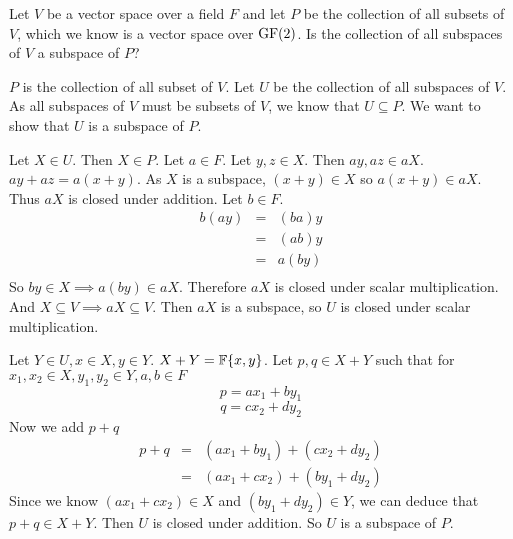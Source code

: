 \begin{problem}[Golan 93]

Let $V$ be a vector space over a field $F$ and let $P$ be the collection of all
subsets of $V$, which we know is a vector space over $\operatorname{GF}(2)$.  Is the
collection of all subspaces of $V$ a subspace of $P$?

\end{problem}
\smallskip
\begin{solution}

$P$ is the collection of all subset of $V$. Let $U$ be the collection of all subspaces of $V$. As all subspaces of $V$ must be subsets of $V$, we know that $U \subseteq P$. We want to show that $U$ is a subspace of $P$.

Let $X \in U$. Then $X \in P$. Let $a \in F$. Let $y,z \in X$.  Then $ay, az \in aX$. $ay + az = a(x+y)$.  As $X$ is a subspace, $(x+y) \in X$ so $a(x+y) \in aX$. Thus $aX$ is closed under addition. Let $b \in F$. 
\begin{eqnarray*}
b(ay) & = & (ba)y \\
	  & = & (ab)y \\
	  & = & a(by) \\
\end{eqnarray*}
So $by \in X \implies a(by) \in aX$. Therefore $aX$ is closed under scalar
multiplication. And $X \subseteq V \implies aX \subseteq V$. Then $aX$ is a
subspace, so $U$ is closed under scalar multiplication. 

Let $Y \in U, x \in X, y \in Y$. $X + Y = \mathbb{F}\{x,y\}$. Let $p,q \in X + Y$ such that for $x_1,x_2 \in X, y_1,y_2 \in Y, a,b \in F$
$$p = ax_1 + by_1$$
$$q = cx_2 + dy_2$$
Now we add $p + q$
\begin{eqnarray}
p + q & = &(ax_1 + by_1) + (cx_2 + dy_2) \\
	  & = &(ax_1 + cx_2) + (by_1 + dy_2) 
\end{eqnarray}
Since we know $(ax_1 + cx_2) \in X$ and $(by_1 + dy_2) \in Y$, we can deduce that $p + q \in X + Y$. Then $U$ is closed under addition.  So $U$ is a subspace of $P$.
\end{solution}
\probskip



